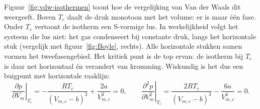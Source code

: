 Figuur~\ref{fig:vdw-isothermen} toont hoe de vergelijking van Van der Waals dit weergeeft. Boven $T_c$ daalt de druk monotoon met het volume: er is maar \'e\'en fase. Onder $T_c$ vertoont de isotherm een S-vormige lus. In werkelijkheid volgt het systeem die lus niet: het gas condenseert bij constante druk, langs het horizontale stuk (vergelijk met figuur~\ref{fig:Boyle}, rechts). Alle horizontale stukken samen vormen het tweefasengebied. Het kritiek punt is de top ervan: de isotherm bij $T_c$ is daar net horizontaal \'en verandert van kromming. Wiskundig is het dus een buigpunt met horizontale raaklijn:
\begin{equation*}
\left.\frac{\partial p}{\partial V_m}\right|_{T_c} = -\frac{RT_c}{(V_{m,c} - b)^2} + \frac{2a}{V_{m,c}^3} = 0,
\qquad
\left.\frac{\partial^2 p}{\partial V_m^2}\right|_{T_c} = \frac{2RT_c}{(V_{m,c} - b)^3} - \frac{6a}{V_{m,c}^4} = 0.
\end{equation*}

